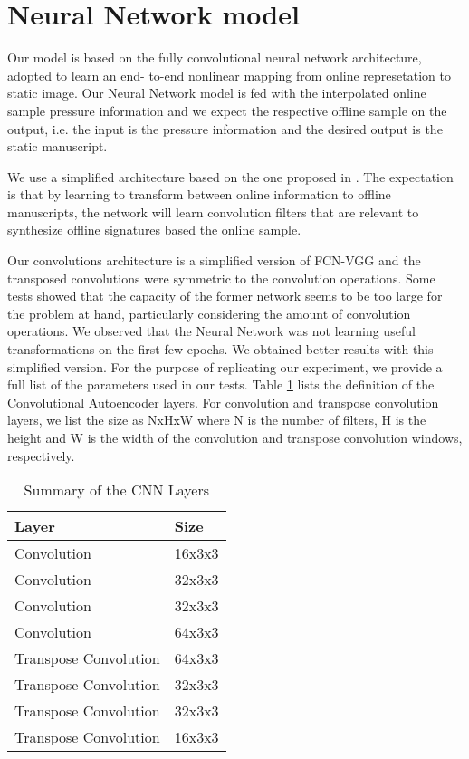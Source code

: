 \section{Neural Network model}

Our model is based on the fully convolutional neural network architecture, adopted to learn an end-
to-end nonlinear mapping from online represetation to static image. Our Neural Network model is fed with the interpolated online sample pressure information and we expect the respective offline sample on the output, i.e. the input is the pressure information and the desired output is the static manuscript.



We use a simplified architecture based on the one proposed in \cite{long2015fully}. The expectation is that by learning to transform between online information to offline manuscripts, the network will learn convolution filters that are relevant to synthesize offline signatures based the online sample.

Our convolutions architecture is a simplified version of FCN-VGG \cite{long2015fully, simonyan2014very} and the transposed convolutions were symmetric to the convolution operations. Some tests showed that the capacity of the former network seems to be too large for the problem at hand, particularly considering the amount of convolution operations. We observed that the Neural Network was not learning useful transformations on the first few epochs. We obtained better results with this simplified version. For the purpose of replicating our experiment, we provide a full list of the parameters used in our tests. Table \ref{table:cnn-arch} lists the definition of the Convolutional Autoencoder layers. For convolution and transpose convolution layers, we list the size as NxHxW where N is the
number of filters, H is the height and W is the width of the convolution and transpose convolution windows, respectively. 

\begin{table}[!htb]
\renewcommand{\arraystretch}{1.3}
\caption{Summary of the CNN Layers}
\centering
\begin{tabular}{|l|l|}
\hline
\textbf{Layer}        & \textbf{Size} \\ \hline
Convolution           & 16x3x3        \\ \hline
Convolution           & 32x3x3        \\ \hline
Convolution           & 32x3x3        \\ \hline
Convolution           & 64x3x3        \\ \hline
Transpose Convolution & 64x3x3        \\ \hline
Transpose Convolution & 32x3x3        \\ \hline
Transpose Convolution & 32x3x3        \\ \hline
Transpose Convolution & 16x3x3        \\ \hline
\end{tabular}
\label{table:cnn-arch}
\end{table}

